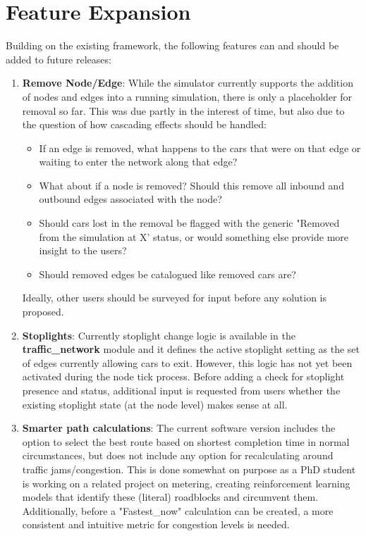 \section{Feature Expansion}

\par Building on the existing framework, the following features can and should be added to future releases:

\begin{enumerate}
    \item \textbf{Remove Node/Edge}:  While the simulator currently supports the addition of nodes and edges into a running simulation, there is only a placeholder for removal so far.  This was due partly in the interest of time, but also due to the question of how cascading effects should be handled:
        \begin{itemize}
            \item If an edge is removed, what happens to the cars that were on that edge or waiting to enter the network along that edge? 
            \item What about if a node is removed?  Should this remove all inbound and outbound edges associated with the node?
            \item Should cars lost in the removal be flagged with the generic "Removed from the simulation at X' status, or would something else provide more insight to the users?
            \item Should removed edges be catalogued like removed cars are?
        \end{itemize}
    Ideally, other users should be surveyed for input before any solution is proposed.
    \item \textbf{Stoplights}:  Currently stoplight change logic is available in the \textbf{traffic\_network} module and it defines the active stoplight setting as the set of edges currently allowing cars to exit.  However, this logic has not yet been activated during the node tick process.  Before adding a check for stoplight presence and status, additional input is requested from users whether the existing stoplight state (at the node level) makes sense at all.
    \item \textbf{Smarter path calculations}:  The current software version includes the option to select the best route based on shortest completion time in normal circumstances, but does not include any option for recalculating around traffic jams/congestion.  This is done somewhat on purpose as a PhD student is working on a related project on metering, creating reinforcement learning models that identify these (literal) roadblocks and circumvent them.  Additionally, before a "Fastest\_now" calculation can be created, a more consistent and intuitive metric for congestion levels is needed.

\end{enumerate}
